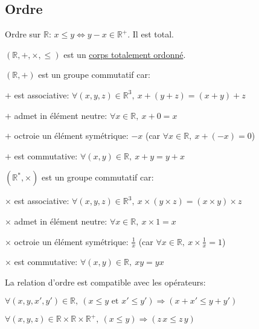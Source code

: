 \documentclass[12pt,twoside,a4paper]{article}
\begin{document}
			\subsection{Ordre}
			Ordre sur $\mathbb{R}$: $x\leqslant y\iff y-x\in\mathbb{R}^+$. Il est total.
			\begin{prop}
				$(\mathbb{R},+,\times,\leqslant)$ est un \underline{corps totalement ordonn\'e}.\\
				\begin{liste}
					\item $(\mathbb{R},+)$ est un groupe commutatif car:
						\begin{liste}
							\item[]$+$ est associative: $\forall(x,y,z)\in \mathbb{R}^3,\ x+(y+z)=(x+y)+z$
							\item[]$+$ admet in \'el\'ement neutre: $\forall x\in\mathbb{R},\ x+0=x$
							\item[]$+$ octroie un \'el\'ement sym\'etrique: $-x$ (car $\forall x\in\mathbb{R},\ x+(-x)=0$)
							\item[]$+$ est commutative: $\forall(x,y)\in\mathbb{R},\ x+y=y+x$
						\end{liste}
					\item $(\mathbb{R}^*,\times)$ est un groupe commutatif car:
						\begin{liste}
							\item[]$\times$ est associative: $\forall(x,y,z)\in \mathbb{R}^3,\ x\times(y\times z)=(x\times y)\times z$
							\item[]$\times$ admet in \'el\'ement neutre: $\forall x\in\mathbb{R},\ x\times1=x$
							\item[]$\times$ octroie un \'el\'ement sym\'etrique: $\frac{1}{x}$ (car $\forall x\in\mathbb{R},\ x\times\frac{1}{x}=1$)
							\item[]$\times$ est commutative: $\forall(x,y)\in\mathbb{R},\ xy=yx$
						\end{liste}
					\item La relation d'ordre est compatible avec les op\'erateurs:
						\begin{liste}
							\item[]$\forall(x,y,x',y')\in\mathbb{R},\ (x\leqslant y\text{ et }x'\leqslant y')\Rightarrow(x+x'\leqslant y+y')$
							\item[]$\forall(x,y,z)\in\mathbb{R}\times\mathbb{R}\times\mathbb{R}^+,\ (x\leqslant y)\Rightarrow (z\,x\leqslant z\,y)$
						\end{liste}
				\end{liste}
			\end{prop}
\end{document}
